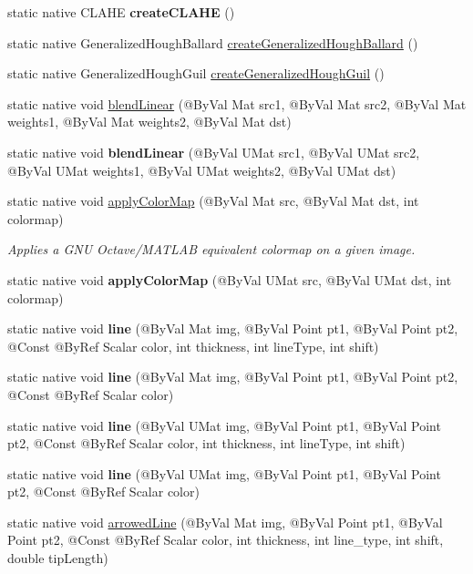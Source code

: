 \begin{DoxyCompactItemize}
\item 
static native C\+L\+A\+HE {\bfseries create\+C\+L\+A\+HE} ()
\item 
static native Generalized\+Hough\+Ballard \hyperlink{group__imgproc__filter_ga9184647c04f254c7cfa32edf2cb43bec}{create\+Generalized\+Hough\+Ballard} ()
\item 
static native Generalized\+Hough\+Guil \hyperlink{group__imgproc__filter_ga5b2d07c2bc26dfd8aa2daeae1b3adfac}{create\+Generalized\+Hough\+Guil} ()
\item 
static native void \hyperlink{group__imgproc__filter_gadbbb8985760a3feef02011466803a5a2}{blend\+Linear} (@By\+Val Mat src1, @By\+Val Mat src2, @By\+Val Mat weights1, @By\+Val Mat weights2, @By\+Val Mat dst)
\item 
static native void {\bfseries blend\+Linear} (@By\+Val U\+Mat src1, @By\+Val U\+Mat src2, @By\+Val U\+Mat weights1, @By\+Val U\+Mat weights2, @By\+Val U\+Mat dst)
\item 
static native void \hyperlink{group__imgproc__colormap_ga06d689b1055417421851333387c2b607}{apply\+Color\+Map} (@By\+Val Mat src, @By\+Val Mat dst, int colormap)
\begin{DoxyCompactList}\small\item\em Applies a G\+NU Octave/\+M\+A\+T\+L\+AB equivalent colormap on a given image. \end{DoxyCompactList}\item 
static native void {\bfseries apply\+Color\+Map} (@By\+Val U\+Mat src, @By\+Val U\+Mat dst, int colormap)
\item 
static native void {\bfseries line} (@By\+Val Mat img, @By\+Val Point pt1, @By\+Val Point pt2, @Const @By\+Ref Scalar color, int thickness, int line\+Type, int shift)
\item 
static native void {\bfseries line} (@By\+Val Mat img, @By\+Val Point pt1, @By\+Val Point pt2, @Const @By\+Ref Scalar color)
\item 
static native void {\bfseries line} (@By\+Val U\+Mat img, @By\+Val Point pt1, @By\+Val Point pt2, @Const @By\+Ref Scalar color, int thickness, int line\+Type, int shift)
\item 
static native void {\bfseries line} (@By\+Val U\+Mat img, @By\+Val Point pt1, @By\+Val Point pt2, @Const @By\+Ref Scalar color)
\item 
static native void \hyperlink{group__imgproc__draw_gae4f0557739b8a995e8297d30b3d8a00c}{arrowed\+Line} (@By\+Val Mat img, @By\+Val Point pt1, @By\+Val Point pt2, @Const @By\+Ref Scalar color, int thickness, int line\+\_\+type, int shift, double tip\+Length)

\end{DoxyCompactItemize}
